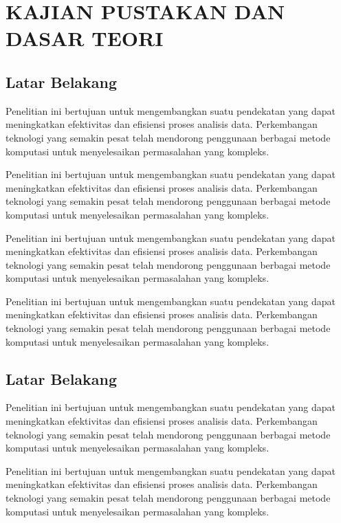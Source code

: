 \chapter{KAJIAN PUSTAKAN DAN DASAR TEORI}

\section{Latar Belakang}

Penelitian ini bertujuan untuk mengembangkan suatu pendekatan yang dapat meningkatkan efektivitas dan efisiensi proses analisis data. Perkembangan teknologi yang semakin pesat telah mendorong penggunaan berbagai metode komputasi untuk menyelesaikan permasalahan yang kompleks.

Penelitian ini bertujuan untuk mengembangkan suatu pendekatan yang dapat meningkatkan efektivitas dan efisiensi proses analisis data. Perkembangan teknologi yang semakin pesat telah mendorong penggunaan berbagai metode komputasi untuk menyelesaikan permasalahan yang kompleks.

Penelitian ini bertujuan untuk mengembangkan suatu pendekatan yang dapat meningkatkan efektivitas dan efisiensi proses analisis data. Perkembangan teknologi yang semakin pesat telah mendorong penggunaan berbagai metode komputasi untuk menyelesaikan permasalahan yang kompleks.

Penelitian ini bertujuan untuk mengembangkan suatu pendekatan yang dapat meningkatkan efektivitas dan efisiensi proses analisis data. Perkembangan teknologi yang semakin pesat telah mendorong penggunaan berbagai metode komputasi untuk menyelesaikan permasalahan yang kompleks.

\section{Latar Belakang}

Penelitian ini bertujuan untuk mengembangkan suatu pendekatan yang dapat meningkatkan efektivitas dan efisiensi proses analisis data. Perkembangan teknologi yang semakin pesat telah mendorong penggunaan berbagai metode komputasi untuk menyelesaikan permasalahan yang kompleks.

Penelitian ini bertujuan untuk mengembangkan suatu pendekatan yang dapat meningkatkan efektivitas dan efisiensi proses analisis data. Perkembangan teknologi yang semakin pesat telah mendorong penggunaan berbagai metode komputasi untuk menyelesaikan permasalahan yang kompleks.

